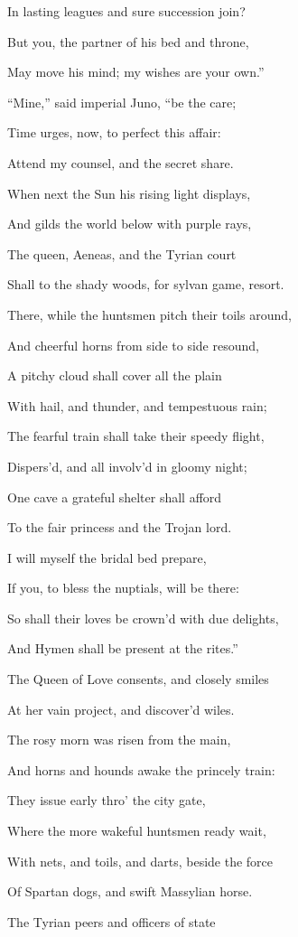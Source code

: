In lasting leagues and sure succession join?

But you, the partner of his bed and throne,

May move his mind; my wishes are your own.”

“Mine,” said imperial Juno, “be the care;

Time urges, now, to perfect this affair:

Attend my counsel, and the secret share.

When next the Sun his rising light displays,

And gilds the world below with purple rays,

The queen, Aeneas, and the Tyrian court

Shall to the shady woods, for sylvan game, resort.

There, while the huntsmen pitch their toils around,

And cheerful horns from side to side resound,

A pitchy cloud shall cover all the plain

With hail, and thunder, and tempestuous rain;

The fearful train shall take their speedy flight,

Dispers’d, and all involv’d in gloomy night;

One cave a grateful shelter shall afford

To the fair princess and the Trojan lord.

I will myself the bridal bed prepare,

If you, to bless the nuptials, will be there:

So shall their loves be crown’d with due delights,

And Hymen shall be present at the rites.”

The Queen of Love consents, and closely smiles

At her vain project, and discover’d wiles.

The rosy morn was risen from the main,

And horns and hounds awake the princely train:

They issue early thro’ the city gate,

Where the more wakeful huntsmen ready wait,

With nets, and toils, and darts, beside the force

Of Spartan dogs, and swift Massylian horse.

The Tyrian peers and officers of state

